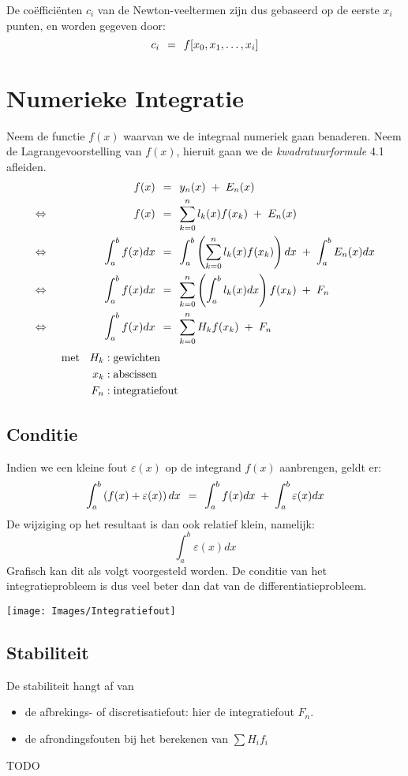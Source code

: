 \documentclass[11pt]{report}
\def \eq {\hspace{1.5mm}=\hspace{1.5mm}}
\def \LRA {\Leftrightarrow\hspace{1.5cm}}
\def \h {\hspace{2mm}}
\def \plus {\hspace{1mm}+\hspace{1mm}}
\begin{document}
	De co\"{e}ffici\"{e}nten $c_i$ van de Newton-veeltermen zijn dus gebaseerd op de eerste $x_i$ punten, en worden gegeven door:
		$$c_i \eq f[x_0, x_1, \dots, x_i]$$
	
\chapter{Numerieke Integratie}
	Neem de functie $f(x)$ waarvan we de integraal numeriek gaan benaderen. Neem de Lagrangevoorstelling van $f(x)$, hieruit gaan we de \textit{kwadratuurformule} 4.1 afleiden.
	\begin{alignat}{2}	
		&& f(x) &\eq y_n(x) \plus E_n(x) \nonumber\\
		\LRA && f(x) &\eq \sum_{k=0}^n l_k(x)f(x_k) \plus E_n(x) \nonumber\\
		\LRA && \int_a^b f(x)dx &\eq \int_a^b \left(\sum_{k=0}^n l_k(x)f(x_k) \right)dx \plus \int_a^b E_n(x)dx \nonumber\\
		\LRA && \int_a^b f(x)dx &\eq \sum_{k=0}^n \left(\int_a^b l_k(x)dx \right)f(x_k) \plus F_n \nonumber\\
		\LRA && \int_a^b f(x)dx &\eq \sum_{k=0}^n H_kf(x_k) \plus F_n
	\end{alignat} 
	\begin{align*}
		\text{met \h} H_k &: \text{gewichten}\hspace{6cm} \\
		x_k &: \text{abscissen} \\
		F_n &: \text{integratiefout}
	\end{align*}
	
\section{Conditie}
	Indien we een kleine fout $\varepsilon(x)$ op de integrand $f(x)$ aanbrengen, geldt er:
	$$\int_a^b \left(f(x) + \varepsilon(x)\right)dx \eq \int_a^b f(x)dx \plus \int_a^b \varepsilon(x)dx$$
	De wijziging op het resultaat is dan ook relatief klein, namelijk:
	$$\int_a^b \varepsilon(x)dx$$
	Grafisch kan dit als volgt voorgesteld worden. De conditie van het integratieprobleem is dus veel beter dan dat van de differentiatieprobleem.

	\begin{center}
		\texttt{[image: Images/Integratiefout]}
	\end{center}
	
\section{Stabiliteit}
	De stabiliteit hangt af van
	\begin{itemize}
		\item de afbrekings- of discretisatiefout: hier de integratiefout $F_n$.
		\item de afrondingsfouten bij het berekenen van $\sum H_if_i$
	\end{itemize}
	TODO
	
\end{document}
